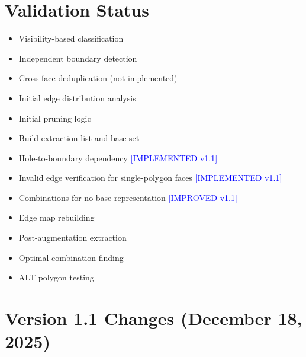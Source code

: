 \documentclass[11pt]{article}
\begin{document}
\section{Validation Status}
\begin{itemize}
    \item[\textcolor{green}{$\checkmark$}] Visibility-based classification
    \item[\textcolor{green}{$\checkmark$}] Independent boundary detection
    \item[\textcolor{red}{$\times$}] Cross-face deduplication (not implemented)
    \item[\textcolor{green}{$\checkmark$}] Initial edge distribution analysis
    \item[\textcolor{green}{$\checkmark$}] Initial pruning logic
    \item[\textcolor{green}{$\checkmark$}] Build extraction list and base set
    \item[\textcolor{green}{$\checkmark$}] Hole-to-boundary dependency \textcolor{blue}{[IMPLEMENTED v1.1]}
    \item[\textcolor{green}{$\checkmark$}] Invalid edge verification for single-polygon faces \textcolor{blue}{[IMPLEMENTED v1.1]}
    \item[\textcolor{green}{$\checkmark$}] Combinations for no-base-representation \textcolor{blue}{[IMPROVED v1.1]}
    \item[\textcolor{green}{$\checkmark$}] Edge map rebuilding
    \item[\textcolor{green}{$\checkmark$}] Post-augmentation extraction
    \item[\textcolor{green}{$\checkmark$}] Optimal combination finding
    \item[\textcolor{green}{$\checkmark$}] ALT polygon testing
\end{itemize}

\section{Version 1.1 Changes (December 18, 2025)}
\end{document}
